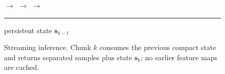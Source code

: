 \begin{figure}[t]
  \centering
  \setlength{\fboxsep}{4pt}
  \small
  $\rightarrow$
  $\rightarrow$
  $\rightarrow$
  \\[-1pt]
  \hspace{0.25\columnwidth}\rule{0.43\columnwidth}{0.35pt}
  \raisebox{-2pt}{$\looparrowleft$}\; persistent state $\mathbf{s}_{k-1}$
  \caption{Streaming inference.  Chunk $k$ consumes the previous compact state
  and returns separated samples plus state $\mathbf{s}_k$; no earlier feature
  maps are cached.}
  \label{fig:overview}
\end{figure}

